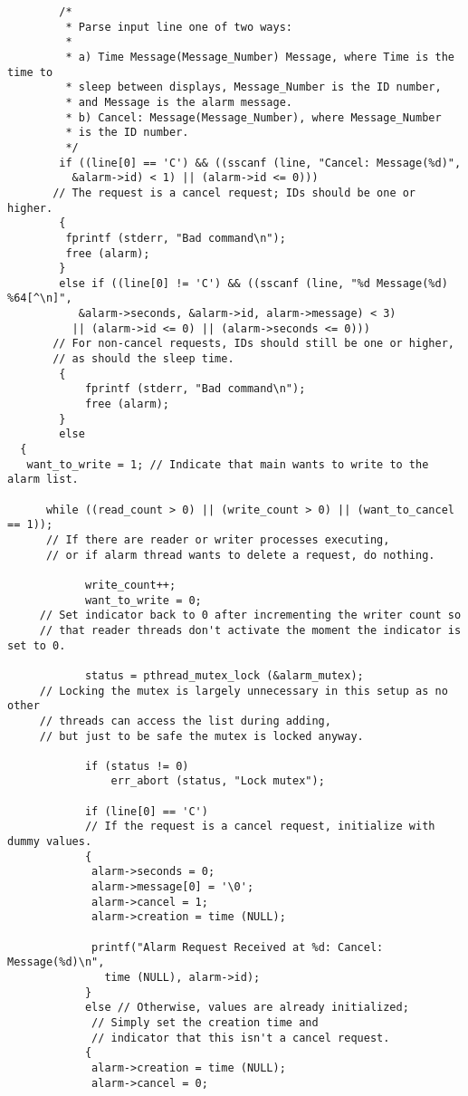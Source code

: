 \documentclass[11pt]{article}
\begin{document}
\begin{lstlisting}
        /*
         * Parse input line one of two ways:
         *
         * a) Time Message(Message_Number) Message, where Time is the time to 
         * sleep between displays, Message_Number is the ID number, 
         * and Message is the alarm message.
         * b) Cancel: Message(Message_Number), where Message_Number 
         * is the ID number.
         */
        if ((line[0] == 'C') && ((sscanf (line, "Cancel: Message(%d)",
          &alarm->id) < 1) || (alarm->id <= 0))) 
       // The request is a cancel request; IDs should be one or higher.
        {
         fprintf (stderr, "Bad command\n");
         free (alarm);
        }
        else if ((line[0] != 'C') && ((sscanf (line, "%d Message(%d) %64[^\n]",
           &alarm->seconds, &alarm->id, alarm->message) < 3) 
          || (alarm->id <= 0) || (alarm->seconds <= 0))) 
       // For non-cancel requests, IDs should still be one or higher, 
       // as should the sleep time.
        {
            fprintf (stderr, "Bad command\n");
            free (alarm);
        }
        else
  {
   want_to_write = 1; // Indicate that main wants to write to the alarm list.
   
      while ((read_count > 0) || (write_count > 0) || (want_to_cancel == 1)); 
      // If there are reader or writer processes executing, 
      // or if alarm thread wants to delete a request, do nothing. 

            write_count++;
            want_to_write = 0; 
     // Set indicator back to 0 after incrementing the writer count so 
     // that reader threads don't activate the moment the indicator is set to 0.
            
            status = pthread_mutex_lock (&alarm_mutex); 
     // Locking the mutex is largely unnecessary in this setup as no other 
     // threads can access the list during adding, 
     // but just to be safe the mutex is locked anyway.
            
            if (status != 0)
                err_abort (status, "Lock mutex");
            
            if (line[0] == 'C') 
            // If the request is a cancel request, initialize with dummy values.
            {
             alarm->seconds = 0;
             alarm->message[0] = '\0';
             alarm->cancel = 1;
             alarm->creation = time (NULL);
             
             printf("Alarm Request Received at %d: Cancel: Message(%d)\n",
               time (NULL), alarm->id);
            }
            else // Otherwise, values are already initialized; 
             // Simply set the creation time and 
             // indicator that this isn't a cancel request.
            {
             alarm->creation = time (NULL);
             alarm->cancel = 0;
             

\end{lstlisting}
\end{document}
